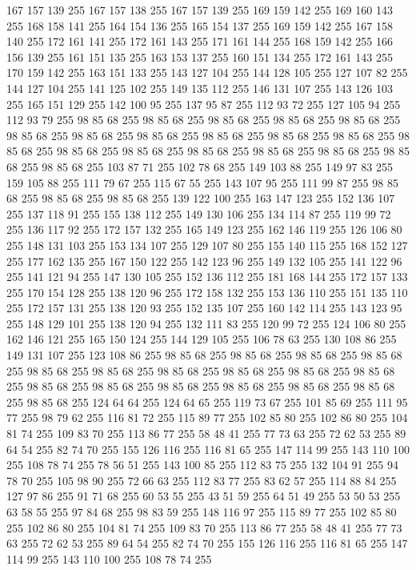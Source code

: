167 157 139 255 167 157 138 255 167 157 139 255 169 159 142 255 169 160 143 255 168 158 141 255 164 154 136 255 165 154 137 255 169 159 142 255 167 158 140 255 172 161 141 255 172 161 143 255 171 161 144 255 168 159 142 255 166 156 139 255 161 151 135 255 163 153 137 255 160 151 134 255 172 161 143 255 170 159 142 255 163 151 133 255 143 127 104 255 144 128 105 255 127 107 82 255 144 127 104 255 141 125 102 255 149 135 112 255 146 131 107 255 143 126 103 255 165 151 129 255 142 100 95 255 137 95 87 255 112 93 72 255 127 105 94 255 112 93 79 255 98 85 68 255 98 85 68 255 98 85 68 255 98 85 68 255 98 85 68 255 98 85 68 255 98 85 68 255 98 85 68 255 98 85 68 255 98 85 68 255 98 85 68 255 98 85 68 255 98 85 68 255 98 85 68 255 98 85 68 255 98 85 68 255 98 85 68 255 98 85 68 255 98 85 68 255 103 87 71 255 102 78 68 255 149 103 88 255 149 97 83 255 159 105 88 255 111 79 67 255 115 67 55 255 143 107 95 255 111 99 87 255 98 85 68 255
98 85 68 255 98 85 68 255 139 122 100 255 163 147 123 255 152 136 107 255 137 118 91 255 155 138 112 255 149 130 106 255 134 114 87 255 119 99 72 255 136 117 92 255 172 157 132 255 165 149 123 255 162 146 119 255 126 106 80 255 148 131 103 255 153 134 107 255 129 107 80 255 155 140 115 255 168 152 127 255 177 162 135 255 167 150 122 255 142 123 96 255 149 132 105 255 141 122 96 255 141 121 94 255 147 130 105 255 152 136 112 255 181 168 144 255 172 157 133 255 170 154 128 255 138 120 96 255 172 158 132 255 153 136 110 255 151 135 110 255 172 157 131 255 138 120 93 255 152 135 107 255 160 142 114 255 143 123 95 255 148 129 101 255 138 120 94 255 132 111 83 255 120 99 72 255 124 106 80 255 162 146 121 255 165 150 124 255 144 129 105 255 106 78 63 255 130 108 86 255 149 131 107 255 123 108 86 255 98 85 68 255 98 85 68 255 98 85 68 255 98 85 68 255 98 85 68 255 98 85 68 255 98 85 68 255 98 85 68 255 98 85 68 255 98 85 68 255 98 85 68 255 98 85 68 255
98 85 68 255 98 85 68 255 98 85 68 255 98 85 68 255 98 85 68 255 124 64 64 255 124 64 65 255 119 73 67 255 101 85 69 255 111 95 77 255 98 79 62 255 116 81 72 255 115 89 77 255 102 85 80 255 102 86 80 255 104 81 74 255 109 83 70 255 113 86 77 255 58 48 41 255 77 73 63 255 72 62 53 255 89 64 54 255 82 74 70 255 155 126 116 255 116 81 65 255 147 114 99 255 143 110 100 255 108 78 74 255 78 56 51 255 143 100 85 255 112 83 75 255 132 104 91 255 94 78 70 255 105 98 90 255 72 66 63 255 112 83 77 255 83 62 57 255 114 88 84 255 127 97 86 255 91 71 68 255 60 53 55 255 43 51 59 255 64 51 49 255 53 50 53 255 63 58 55 255 97 84 68 255 98 83 59 255 148 116 97 255 115 89 77 255 102 85 80 255 102 86 80 255 104 81 74 255 109 83 70 255 113 86 77 255 58 48 41 255 77 73 63 255 72 62 53 255 89 64 54 255 82 74 70 255 155 126 116 255 116 81 65 255 147 114 99 255 143 110 100 255 108 78 74 255
